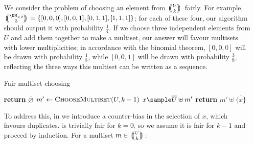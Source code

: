 \documentclass[letterpaper,luatex,11pt]{article}
\newcommand{\multichoose}[2]{
\left.\mathchoice
  {\left(\kern-0.48em\binom{#1}{#2}\kern-0.48em\right)}
  {\big(\kern-0.30em\binom{\smash{#1}}{\smash{#2}}\kern-0.30em\big)}
  {\left(\kern-0.30em\binom{\smash{#1}}{\smash{#2}}\kern-0.30em\right)}
  {\left(\kern-0.30em\binom{\smash{#1}}{\smash{#2}}\kern-0.30em\right)}
\right.}
\begin{document}
We consider the problem of choosing an element from $\multichoose{U}{k}$ fairly.
For example, $\multichoose{\NN_{<2}}{3} = \{[0, 0, 0], [0, 0, 1], [0, 1, 1], [1, 1, 1]\}$; 
for each of these four, our algorithm should output it with probability $\frac{1}{4}$.
If we choose three independent elements from $U$ and add them together to make a multiset,
our answer will favour multisets with lower multiplicities; in accordance
with the binomial theorem, $[0, 0, 0]$ will be drawn with probability $\frac{1}{8}$, while
$[0, 0, 1]$ will be drawn with probability $\frac{3}{8}$, reflecting the three ways this multiset
can be written as a sequence.



\begin{algorithm}
\caption{Fair multiset choosing}
\begin{algorithmic}[0]
        \State \textbf{return} $\overline{\varnothing}$
    \Else
        \State $m' \leftarrow \textproc{ChooseMultiset}(U, k-1)$
        \State $x \sample \overline{U} \uplus m'$
        \State \textbf{return} $m' \uplus \overline{\{x\}}$
    \EndIf
\EndProcedure
\end{algorithmic}
\end{algorithm}

To address this, in 
we introduce a counter-bias in the selection of $x$, which favours duplicates.
 is trivially fair for $k = 0$, so
we assume it is fair for $k - 1$ and proceed by induction.
For a multiset $m \in \multichoose{U}{k}$:
\end{document}
